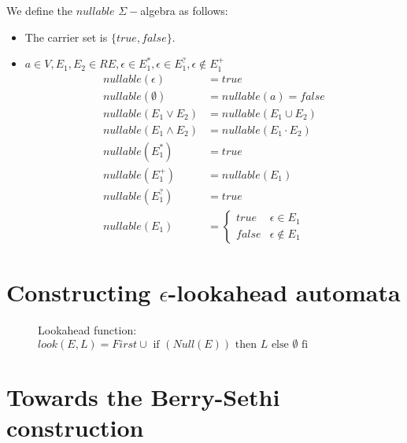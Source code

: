 \begin{definition}
	We define the $nullable$ $\Sigma-$algebra as follows:
	\begin{itemize}
	\item The carrier set is $\{true,false\}$.
	\item $a\in V,E_1,E_2\in RE, \epsilon\in E_1^\ast,\epsilon\in E_1^?,\epsilon\notin E_1^+$
		\begin{align*}
			nullable(\epsilon) &= true \\
			nullable(\emptyset)&=nullable(a)=false \\
			nullable(E_1\lor E_2) &=nullable(E_1\cup E_2)\\
			nullable(E_1\land E_2) &=nullable(E_1\cdot E_2) \\
			nullable(E_1^\ast) &= true\\
			nullable(E_1^+) &=nullable(E_1) \\
			nullable(E_1^?) &=true\\
			nullable(E_1) &=
			\begin{cases}
				true   & \epsilon\in E_1\\
				false  & \epsilon\notin E_1
			\end{cases}
		\end{align*} 
	\end{itemize}
\end{definition}


\section{Constructing $\epsilon$-lookahead automata}

\begin{figure}[htbp]
\caption{Lookahead function:$look(E,L)=First\cup\text{ if }(Null(E))\text{ then }L \text{ else } \emptyset \text{ fi }$}
\end{figure}


\section{Towards the Berry-Sethi construction}

